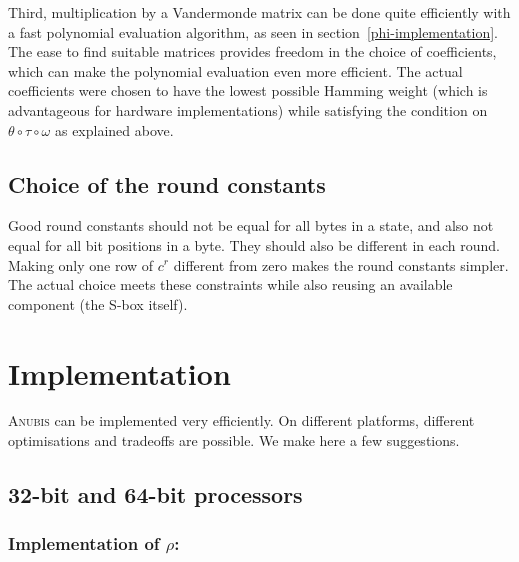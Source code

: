 \documentclass{llncs}
\begin{document}
Third, multiplication by a Vandermonde matrix can be done quite
efficiently with a fast polynomial evaluation algorithm, as seen
in section~\ref{phi-implementation}. The ease to find suitable
matrices provides freedom in the choice of coefficients, which
can make the polynomial evaluation even more efficient. The
actual coefficients were chosen to have the lowest possible
Hamming weight (which is advantageous for hardware
implementations) while satisfying the condition on $\theta \circ
\tau \circ \omega$ as explained above.

\subsection{Choice of the round constants}

Good round constants should not be equal for all bytes in a state,
and also not equal for all bit positions in a byte. They should
also be different in each round. Making only one row of $c^r$
different from zero makes the round constants simpler. The actual
choice meets these constraints while also reusing an available
component (the S-box itself).

\section{Implementation}\label{implementation}

\textsc{Anubis} can be implemented very efficiently. On different
platforms, different optimisations and tradeoffs are possible. We
make here a few suggestions.

\subsection{32-bit and 64-bit processors} \label{large-processors}

\subsubsection{Implementation of
$\rho$:}\label{rho-implementation}
\end{document}
